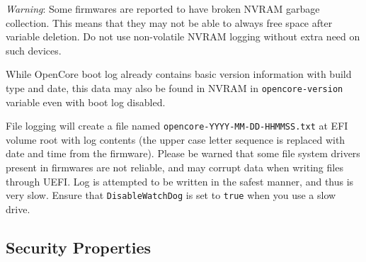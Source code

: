 \documentclass[]{article}
\makeatletter
\renewcommand{\label}[1]{%
\zref@wrapper@immediate{\oldlabel{#1}}}  %
\makeatother
\begin{document}
\begin{enumerate}
  \emph{Warning}: Some firmwares are reported to have broken NVRAM garbage collection.
  This means that they may not be able to always free space after variable deletion.
  Do not use non-volatile NVRAM logging without extra need on such devices.

  While OpenCore boot log already contains basic version information with build type and
  date, this data may also be found in NVRAM in \texttt{opencore-version} variable
  even with boot log disabled.

  File logging will create a file named \texttt{opencore-YYYY-MM-DD-HHMMSS.txt} at EFI
  volume root with log contents (the upper case letter sequence is replaced with date
  and time from the firmware). Please be warned that some file system drivers present
  in firmwares are not reliable, and may corrupt data when writing files through UEFI.
  Log is attempted to be written in the safest manner, and thus is very slow. Ensure that
  \texttt{DisableWatchDog} is set to \texttt{true} when you use a slow drive.

\end{enumerate}

\subsection{Security Properties}\label{miscsecurityprops}
\end{document}
